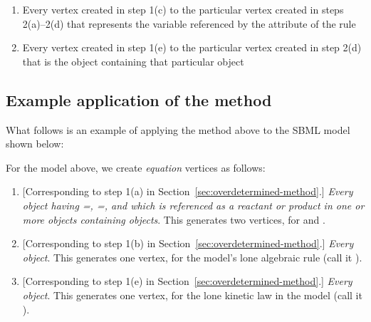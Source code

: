 \begin{enumerate}
\begin{enumerate}
  \item Every vertex created in step 1(c) to the particular vertex
    created in steps 2(a)--2(d) that represents the variable
    referenced by the  attribute of the rule
    
  \item Every vertex created in step 1(e) to the particular vertex
    created in step 2(d) that is the \Reaction object containing
    that particular \KineticLaw object
    
    
  \end{enumerate}

\end{enumerate}


\subsection*{Example application of the method}

What follows is an example of applying the method above to the
SBML model shown below:


For the model above, we create \emph{equation} vertices as
follows:
\begin{enumerate}\setlength{\parskip}{0.2ex}
  
\item{} [Corresponding to step 1(a) in
  Section~\ref{sec:overdetermined-method}.]  \emph{Every \Species
    object having =,
    =, and which is referenced as a
    reactant or product in one or more \Reaction objects
    containing \KineticLaw objects}.  This generates two vertices,
  for  and .
  
\item{} [Corresponding to step 1(b)
  in Section~\ref{sec:overdetermined-method}.] \emph{Every
    \AlgebraicRule object}.  This generates one vertex, for the
  model's lone algebraic rule (call it ).
  
\item{} [Corresponding to step 1(e)
  in Section~\ref{sec:overdetermined-method}.] \emph{Every \KineticLaw
    object}.  This generates one vertex, for the lone kinetic law
  in the model (call it ).

\end{enumerate}

